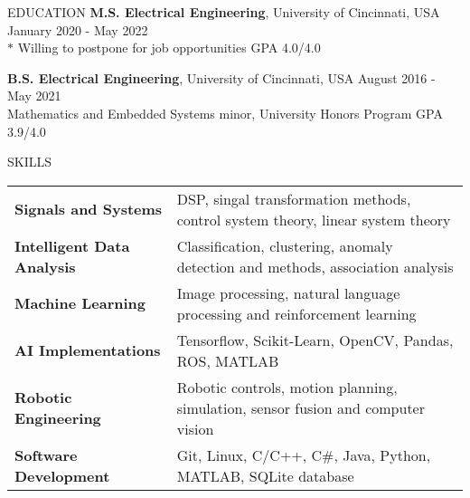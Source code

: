 \documentclass{../lib/resume} %
\begin{document}

\begin{rSection}{EDUCATION}
    {\bf M.S. Electrical Engineering}, University of Cincinnati, USA \hfill {January 2020 - May 2022} \\
    $*$ Willing to postpone for job opportunities \hfill GPA 4.0/4.0 \smallskip

    {\bf B.S. Electrical Engineering}, University of Cincinnati, USA \hfill {August 2016 - May 2021}\\
    Mathematics and Embedded Systems minor, University Honors Program \hfill {GPA 3.9/4.0}



\end{rSection}

\begin{rSection}{SKILLS}

    \begin{tabular}{ @{} >{\bfseries}l @{\hspace{2ex}} l }
        Signals and Systems       & DSP, singal transformation methods, control system theory, linear system theory  \\
        Intelligent Data Analysis & Classification, clustering, anomaly detection and methods, association analysis  \\
        Machine Learning          & Image processing, natural language processing and reinforcement learning         \\
        AI Implementations        & Tensorflow, Scikit-Learn, OpenCV, Pandas, ROS, MATLAB                                 \\
        Robotic Engineering       & Robotic controls, motion planning, simulation, sensor fusion and computer vision \\
        Software Development      & Git, Linux, C/C++, C\#, Java, Python, MATLAB, SQLite database                                \\
    \end{tabular}
\end{rSection}
\end{document}
